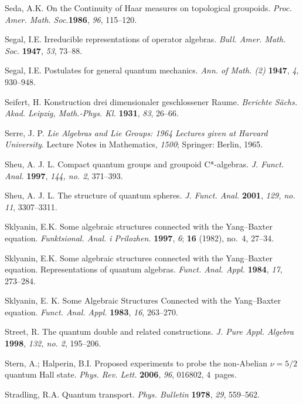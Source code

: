 \documentclass[12pt]{article}
\theoremstyle{plain}
\theoremstyle{definition}
\numberwithin{equation}{section}
\begin{document}
\begin{thebibliography}{199}
Seda, A.K. On the Continuity of Haar measures on topological groupoids. \emph{Proc. Amer. Math. Soc.}{\bf 1986}, {\em 96}, 115--120.

Segal, I.E. Irreducible representations of operator algebras. \emph{Bull. Amer. Math. Soc.}   {\bf 1947}, {\em 53}, 73--88.

Segal, I.E. Postulates for general quantum mechanics. \emph{Ann. of Math. (2)} {\bf 1947}, {\em 4}, 930--948.

Seifert, H.  Konstruction drei dimensionaler geschlossener Raume. {\em Berichte S{\"a}chs. {A}kad. {L}eipzig, Math.-Phys. Kl.}  {\bf 1931}, {\em 83}, 26--66.

Serre, J. P. {\em Lie Algebras and Lie Groups: 1964 Lectures given at Harvard University}. Lecture Notes in Mathematics, {\em 1500}; Springer: Berlin, 1965.

Sheu, A. J. L. Compact quantum groups and groupoid C*-algebras. \emph{J. Funct. Anal.} {\bf 1997}, {\em 144, no. 2}, 371--393.

Sheu, A. J. L. The structure of quantum spheres. {\em J. Funct. Anal.}  {\bf 2001}, {\em 129, no. 11}, 3307--3311.

Sklyanin, E.K. Some algebraic structures connected with the Yang--Baxter equation. {\em Funktsional. Anal. i Prilozhen.} {\bf 1997}, {\em 6}; {\bf 16} (1982), no.~4, 27--34.

Sklyanin, E.K. Some algebraic structures connected with the Yang--Baxter equation. Representations of quantum algebras. {\em Funct. Anal. Appl.}  {\bf 1984}, {\em 17}, 273--284.

Sklyanin, E. K. Some Algebraic Structures Connected with the Yang--Baxter equation. {\em Funct. Anal. Appl.}  {\bf 1983}, {\em 16}, 263--270.

Street, R. The quantum double and related constructions. {\em J. Pure Appl. Algebra} {\bf 1998}, {\em 132, no. 2}, 195--206.

Stern, A.; Halperin, B.I. Proposed experiments to probe the non-Abelian $\nu=5/2$ quantum Hall state. {\em Phys. Rev. Lett.}  {\bf 2006}, {\em 96}, 016802, 4~pages. 


Stradling, R.A. Quantum transport. {\em Phys. Bulletin}  {\bf 1978}, {\em 29}, 559--562.


\end{thebibliography}
\end{document}
